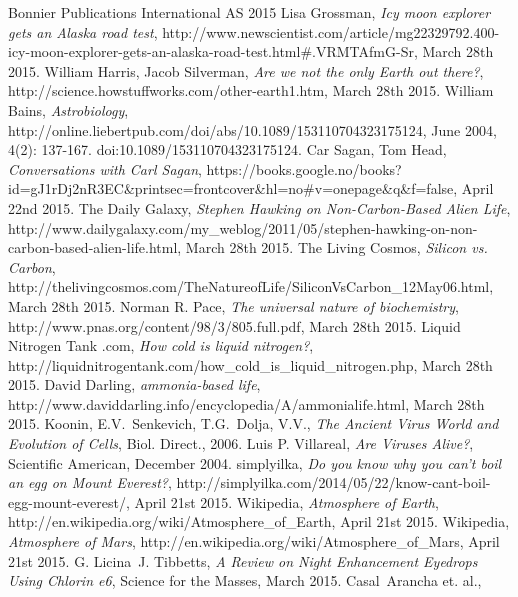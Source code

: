 \begin{thebibliography}{99}
		Bonnier Publications International AS
		2015
		Lisa Grossman,
		\emph{Icy moon explorer gets an Alaska road test},
		http://www.newscientist.com/article/mg22329792.400-icy-moon-explorer-gets-an-alaska-road-test.html\#.VRMTAfmG-Sr,
		March 28th 2015.
		William Harris, Jacob Silverman,
		\emph{Are we not the only Earth out there?},
		http://science.howstuffworks.com/other-earth1.htm,
		March 28th 2015.
		William Bains,
		\emph{Astrobiology},
		http://online.liebertpub.com/doi/abs/10.1089/153110704323175124,
		June 2004, 4(2): 137-167. doi:10.1089/153110704323175124.
		Car Sagan, Tom Head,
		\emph{Conversations with Carl Sagan},
		https://books.google.no/books?id=gJ1rDj2nR3EC\&printsec=frontcover\&hl=no\#v=onepage\&q\&f=false,
		April 22nd 2015.
		The Daily Galaxy,
		\emph{Stephen Hawking on Non-Carbon-Based Alien Life},
		http://www.dailygalaxy.com/my\_weblog/2011/05/stephen-hawking-on-non-carbon-based-alien-life.html,
		March 28th 2015.
		The Living Cosmos,
		\emph{Silicon vs. Carbon},
		http://thelivingcosmos.com/TheNatureofLife/SiliconVsCarbon\_12May06.html,
		March 28th 2015.
		Norman R. Pace,
		\emph{The universal nature of biochemistry},
		http://www.pnas.org/content/98/3/805.full.pdf,
		March 28th 2015.
		Liquid Nitrogen Tank .com,
		\emph{How cold is liquid nitrogen?},
		http://liquidnitrogentank.com/how\_cold\_is\_liquid\_nitrogen.php,
		March 28th 2015.
		David Darling,
		\emph{ammonia-based life},
		http://www.daviddarling.info/encyclopedia/A/ammonialife.html,
		March 28th 2015.
		Koonin, E.V.\, Senkevich, T.G.\, Dolja, V.V.,
		\emph{The Ancient Virus World and Evolution of Cells},
		Biol. Direct.,
		2006.
		Luis P. Villareal,
		\emph{Are Viruses Alive?},
		Scientific American,
		December 2004.
		simplyilka,
		\emph{Do you know why you can’t boil an egg on Mount Everest?},
		http://simplyilka.com/2014/05/22/know-cant-boil-egg-mount-everest/,
		April 21st 2015.
		Wikipedia,
		\emph{Atmosphere of Earth},
		http://en.wikipedia.org/wiki/Atmosphere\_of\_Earth,
		April 21st 2015.
		Wikipedia,
		\emph{Atmosphere of Mars},
		http://en.wikipedia.org/wiki/Atmosphere\_of\_Mars,
		April 21st 2015.
		G. Licina\, J. Tibbetts,
		\emph{A Review on Night Enhancement Eyedrops Using Chlorin e6},
		Science for the Masses,
		March 2015.
		Casal\, Arancha et. al.,

\end{thebibliography}
